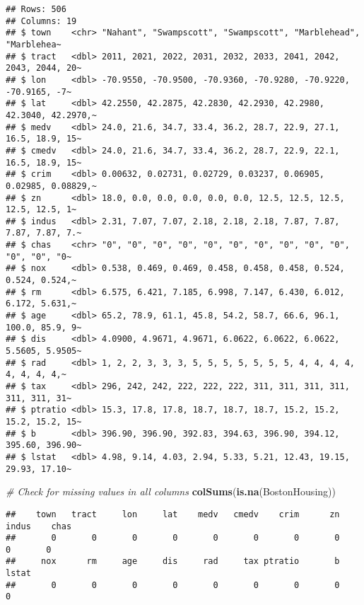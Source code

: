 \documentclass[
]{book}
\newenvironment{Shaded}{\begin{snugshade}}{\end{snugshade}}
\newcommand{\CommentTok}[1]{\textcolor[rgb]{0.56,0.35,0.01}{\textit{#1}}}
\newcommand{\FunctionTok}[1]{\textcolor[rgb]{0.13,0.29,0.53}{\textbf{#1}}}
\newcommand{\NormalTok}[1]{#1}
\begin{document}
\begin{verbatim}
## Rows: 506
## Columns: 19
## $ town    <chr> "Nahant", "Swampscott", "Swampscott", "Marblehead", "Marblehea~
## $ tract   <dbl> 2011, 2021, 2022, 2031, 2032, 2033, 2041, 2042, 2043, 2044, 20~
## $ lon     <dbl> -70.9550, -70.9500, -70.9360, -70.9280, -70.9220, -70.9165, -7~
## $ lat     <dbl> 42.2550, 42.2875, 42.2830, 42.2930, 42.2980, 42.3040, 42.2970,~
## $ medv    <dbl> 24.0, 21.6, 34.7, 33.4, 36.2, 28.7, 22.9, 27.1, 16.5, 18.9, 15~
## $ cmedv   <dbl> 24.0, 21.6, 34.7, 33.4, 36.2, 28.7, 22.9, 22.1, 16.5, 18.9, 15~
## $ crim    <dbl> 0.00632, 0.02731, 0.02729, 0.03237, 0.06905, 0.02985, 0.08829,~
## $ zn      <dbl> 18.0, 0.0, 0.0, 0.0, 0.0, 0.0, 12.5, 12.5, 12.5, 12.5, 12.5, 1~
## $ indus   <dbl> 2.31, 7.07, 7.07, 2.18, 2.18, 2.18, 7.87, 7.87, 7.87, 7.87, 7.~
## $ chas    <chr> "0", "0", "0", "0", "0", "0", "0", "0", "0", "0", "0", "0", "0~
## $ nox     <dbl> 0.538, 0.469, 0.469, 0.458, 0.458, 0.458, 0.524, 0.524, 0.524,~
## $ rm      <dbl> 6.575, 6.421, 7.185, 6.998, 7.147, 6.430, 6.012, 6.172, 5.631,~
## $ age     <dbl> 65.2, 78.9, 61.1, 45.8, 54.2, 58.7, 66.6, 96.1, 100.0, 85.9, 9~
## $ dis     <dbl> 4.0900, 4.9671, 4.9671, 6.0622, 6.0622, 6.0622, 5.5605, 5.9505~
## $ rad     <dbl> 1, 2, 2, 3, 3, 3, 5, 5, 5, 5, 5, 5, 5, 4, 4, 4, 4, 4, 4, 4, 4,~
## $ tax     <dbl> 296, 242, 242, 222, 222, 222, 311, 311, 311, 311, 311, 311, 31~
## $ ptratio <dbl> 15.3, 17.8, 17.8, 18.7, 18.7, 18.7, 15.2, 15.2, 15.2, 15.2, 15~
## $ b       <dbl> 396.90, 396.90, 392.83, 394.63, 396.90, 394.12, 395.60, 396.90~
## $ lstat   <dbl> 4.98, 9.14, 4.03, 2.94, 5.33, 5.21, 12.43, 19.15, 29.93, 17.10~
\end{verbatim}

\begin{Shaded}
\begin{Highlighting}[]
\CommentTok{\# Check for missing values in all columns}
\FunctionTok{colSums}\NormalTok{(}\FunctionTok{is.na}\NormalTok{(BostonHousing))}
\end{Highlighting}
\end{Shaded}

\begin{verbatim}
##    town   tract     lon     lat    medv   cmedv    crim      zn   indus    chas 
##       0       0       0       0       0       0       0       0       0       0 
##     nox      rm     age     dis     rad     tax ptratio       b   lstat 
##       0       0       0       0       0       0       0       0       0
\end{verbatim}
\end{document}
